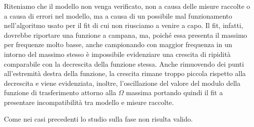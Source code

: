 Riteniamo che il modello non venga verificato, non a causa delle misure raccolte o a causa di errori nel modello, ma a causa di un possibile mal funzionamento nell’algoritmo usato per il fit di cui non riusciamo a venire a capo. Il fit, infatti, dovrebbe riportare una funzione a campana, ma, poiché essa presenta il massimo per frequenze molto basse, anche campionando con maggior frequenza in un intorno del massimo stesso è impossibile evidenziare una crescita di ripidità comparabile con la decrescita della funzione stessa. Anche rimuovendo dei punti all’estremità destra della funzione, la crescita rimane troppo 
piccola rispetto alla decrescita e viene evidenziata, inoltre, l’oscillazione del valore del modulo della funzione di trasferimento attorno alla $\Omega$ massima portando quindi il fit a presentare incompatibilità tra modello e misure raccolte.

Come nei casi precedenti lo studio sulla fase non risulta valido.
